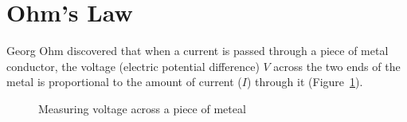 %




\section{Ohm's Law}

Georg Ohm discovered that when a current is passed through a piece of metal
conductor, the voltage (electric potential difference) $V$ across the two ends
of the metal is proportional to the amount of current ($I$) through it
(Figure~\ref{fig:ohm1}).
\begin{figure}[ht]
  \centering
  \caption{Measuring voltage across a piece of meteal}
  \label{fig:ohm1}
\end{figure}


